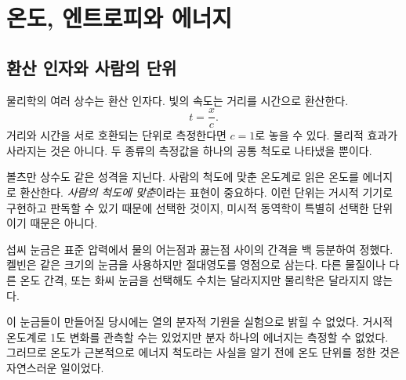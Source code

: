 \chapter{온도, 엔트로피와 에너지}


\section{환산 인자와 사람의 단위}

물리학의 여러 상수는 환산 인자다. 빛의 속도는 거리를 시간으로 환산한다.
\begin{equation}
 t=\frac{x}{c}.
\end{equation}
거리와 시간을 서로 호환되는 단위로 측정한다면 \(c=1\)로 놓을 수 있다. 물리적 효과가 사라지는 것은 아니다. 두 종류의 측정값을 하나의 공통 척도로 나타냈을 뿐이다.

볼츠만 상수도 같은 성격을 지닌다. 사람의 척도에 맞춘 온도계로 읽은 온도를 에너지로 환산한다. \emph{사람의 척도에 맞춘}이라는 표현이 중요하다. 이런 단위는 거시적 기기로 구현하고 판독할 수 있기 때문에 선택한 것이지, 미시적 동역학이 특별히 선택한 단위이기 때문은 아니다.

섭씨 눈금은 표준 압력에서 물의 어는점과 끓는점 사이의 간격을 백 등분하여 정했다. 켈빈은 같은 크기의 눈금을 사용하지만 절대영도를 영점으로 삼는다. 다른 물질이나 다른 온도 간격, 또는 화씨 눈금을 선택해도 수치는 달라지지만 물리학은 달라지지 않는다.

\begin{classroomqa}
\end{classroomqa}

이 눈금들이 만들어질 당시에는 열의 분자적 기원을 실험으로 밝힐 수 없었다. 거시적 온도계로 1도 변화를 관측할 수는 있었지만 분자 하나의 에너지는 측정할 수 없었다. 그러므로 온도가 근본적으로 에너지 척도라는 사실을 알기 전에 온도 단위를 정한 것은 자연스러운 일이었다.

